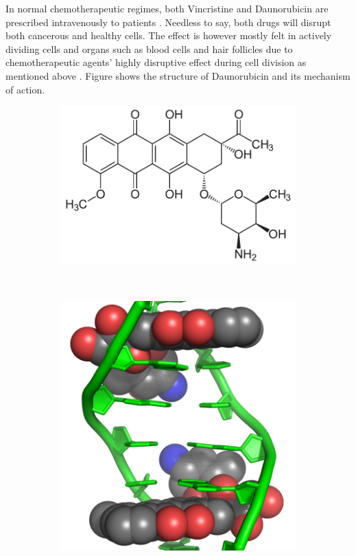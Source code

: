 \documentclass[pdftex,12pt,a4paper]{report}
\begin{document}
In normal chemotherapeutic regimes, both Vincristine and Daunorubicin are prescribed intravenously to patients \cite{skeel2011handbook}. Needless to say, both drugs will disrupt both cancerous and healthy cells. The effect is however mostly felt in actively dividing cells and organs such as blood cells and hair follicles due to chemotherapeutic agents' highly disruptive effect during cell division as mentioned above \cite{skeel2011handbook, mayo2018chemotherapy}. Figure \cite{yang2014doxorubicin} shows the structure of Daunorubicin and its mechanism of action.

\begin{figure}[H]
\begin{subfigure}{.5\textwidth}
  \centering
  \includegraphics[width=\textwidth]{images/daunorubicin}
  \caption{}
  \label{fig:dauno}
\end{subfigure}
~
\begin{subfigure}{.35\textwidth}
  \centering
  \includegraphics[width=\textwidth]{images/doxorubicin_dna}

\end{subfigure}
\end{figure}
\end{document}
